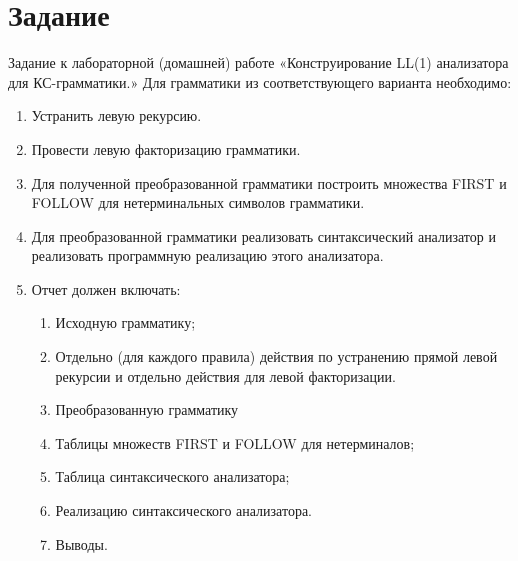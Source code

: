 \documentclass[12pt,onecolumn]{article}
\begin{document}
\section*{Задание}
Задание к лабораторной (домашней) работе  «Конструирование LL(1) анализатора для КС-грамматики.»
Для грамматики из соответствующего варианта необходимо:
\begin{enumerate}
    \item Устранить левую рекурсию.
    \item Провести левую факторизацию грамматики.
    \item Для полученной преобразованной грамматики построить множества FIRST и\\ FOLLOW для нетерминальных символов грамматики.
    \item Для преобразованной грамматики реализовать синтаксический анализатор и реализовать программную реализацию этого анализатора.
    \item {
          Отчет должен включать:
          \begin{enumerate}
              \item Исходную грамматику;
              \item Отдельно (для каждого правила) действия по устранению прямой левой рекурсии и отдельно действия для левой факторизации.
              \item Преобразованную грамматику
              \item Таблицы множеств FIRST и FOLLOW для нетерминалов;
              \item Таблица синтаксического анализатора;
              \item Реализацию синтаксического анализатора.
              \item Выводы.
          \end{enumerate}
          }

\end{enumerate}
\begin{center}
\end{center}
\end{document}
